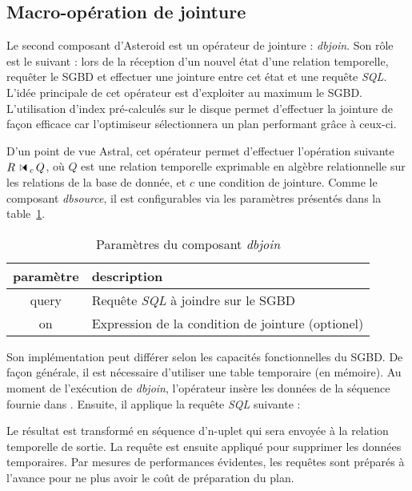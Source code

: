 \subsection{Macro-opération de jointure}
Le second composant d'Asteroid est un opérateur de jointure : \textit{dbjoin}. Son rôle est le suivant : lors de la réception d'un nouvel état d'une relation temporelle, requêter le SGBD et effectuer une jointure entre cet état et une requête \textit{SQL}. L'idée principale de cet opérateur est d'exploiter au maximum le SGBD. L'utilisation d'index pré-calculés sur le disque permet d'effectuer la jointure de façon efficace car l'optimiseur sélectionnera un plan performant grâce à ceux-ci.

D'un point de vue Astral, cet opérateur permet d'effectuer l'opération suivante $R \ssjoin_c Q$, où $Q$ est une relation temporelle exprimable en algèbre relationnelle sur les relations de la base de donnée, et $c$ une condition de jointure. Comme le composant \textit{dbsource}, il est configurables via les paramètres présentés dans la table~\ref{tab:contrib:asteroid:dbjoin}.
\begin{table}[ht]
    \centering
    \begin{tabular}{cl}
        paramètre & description \\ \midrule
        query & Requête \textit{SQL} à joindre sur le SGBD \\
        on & Expression de la condition de jointure (optionel)
    \end{tabular}
    \caption{Paramètres du composant \textit{dbjoin}}\label{tab:contrib:asteroid:dbjoin}
\end{table}

Son implémentation peut différer selon les capacités fonctionnelles du SGBD. De façon générale, il est nécessaire d'utiliser une table temporaire  (en mémoire). Au moment de l'exécution de \textit{dbjoin}, l'opérateur insère les données de la séquence fournie dans . Ensuite, il applique la requête \textit{SQL} suivante : \begin{center}  \end{center}
Le résultat est transformé en séquence d'n-uplet qui sera envoyée à la relation temporelle de sortie. La requête  est ensuite appliqué pour supprimer les données temporaires. Par mesures de performances évidentes, les requêtes sont préparés à l'avance pour ne plus avoir le coût de préparation du plan.

